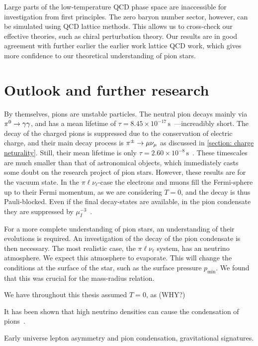 Large parts of the low-temperature QCD phase space are inaccessible for investigation from first principles.
The zero baryon number sector, however, can be simulated using QCD lattice methods.
This allows us to cross-check our effective theories, such as chiral perturbation theory.
Our results are in good agreement with further earlier the earlier work lattice QCD work, which gives more confidence to our theoretical understanding of pion stars.


\section{Outlook and further research}

By themselves, pions are unstable particles.
The neutral pion decays mainly via ${\pi^0}\rightarrow \gamma\gamma$, and has a mean lifetime of $\tau = 8.45\times 10^{-17}\,\text{s}$~\autocite{particledatagroupReviewParticlePhysics2020}---increadibly short.
The decay of the charged pions is suppressed due to the conservation of electric charge, and their main decay process is ${\pi^\pm}\rightarrow \mu \nu_\mu$ as discussed in \autoref{section: charge neturality}.
Still, their mean lifetime is only $\tau = 2.60\times 10^{-8}\,\text{s}$~\autocite{particledatagroupReviewParticlePhysics2020}.
These timescales are much smaller than that of astronomical objects, which immediately casts some doubt on the research project of pion stars.
However, these results are for the vacuum state.
In the $\pi\ell\nu_\ell$-case the electrons and muons fill the Fermi-sphere up to their Fermi momentum, as we are considering $T = 0$, and the decay is thus Pauli-blocked.
Even if the final decay-states are available, in the pion condensate they are suppressed by $\mu_I^{-3}$~\autocite{brandtNewClassCompact2018}.

For a more complete understanding of pion stars, an understanding of their evolutions is required.
An investigation of the decay of the pion condensate is then necessary.
The most realistic case, the $\pi\ell\nu_\ell$ system, has an neutrino atmosphere.
We expect this atmosphere to evaporate.
This will change the conditions at the surface of the star, such as the surface pressure $p_\text{min}$.
We found that this was crucial for the mass-radius relation.


We have throughout this thesis assumed $T = 0$, as (WHY?)


It has been shown that high neutrino densities can cause the condensation of pions~\autocite{abukiPionCondensationDense2009}.

Early universe lepton asymmetry and pion condensation, gravitational signatures\autocite{vovchenkoPionCondensationEarly2021,wygasCosmicQCDEpoch2018}.


